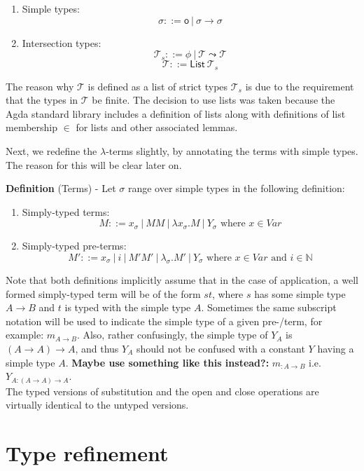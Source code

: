 \documentclass[a4paper, 12pt, twoside]{style/ociamthesis}
\providecommand{\tightlist}{%
  \setlength{\itemsep}{0pt}\setlength{\parskip}{0pt}}
\begin{document}
\begin{enumerate}
\def\labelenumi{\roman{enumi})}
\tightlist
\item
  Simple types: \[\sigma ::= \mathsf{o}\ |\ \sigma \to \sigma\]
\item
  Intersection types:
  \[\mathcal{T}_s ::= \phi\ |\ \mathcal{T} \leadsto \mathcal{T}\]
  \[\mathcal{T} ::= \mathsf{List}\ \mathcal{T}_s\]
\end{enumerate}

The reason why \(\mathcal{T}\) is defined as a list of strict types
\(\mathcal{T}_s\) is due to the requirement that the types in
\(\mathcal{T}\) be finite. The decision to use lists was taken because
the Agda standard library includes a definition of lists along with
definitions of list membership \(\in\) for lists and other associated
lemmas.

Next, we redefine the \(\lambda\)-terms slightly, by annotating the
terms with simple types. The reason for this will be clear later on.

\textbf{Definition} (Terms) - Let \(\sigma\) range over simple types in
the following definition:

\begin{enumerate}
\def\labelenumi{\roman{enumi})}
\tightlist
\item
  Simply-typed terms:
  \[M::= x_\sigma\ |\ MM\ |\ \lambda x_\sigma.M\ |\ Y_\sigma \text{ where }x \in Var\]
\item
  Simply-typed pre-terms:
  \[M'::= x_\sigma\ |\ i\ |\ M'M'\ |\ \lambda_\sigma.M'\ |\ Y_\sigma \text{ where }x \in Var\text{ and }i \in \mathbb{N}\]
\end{enumerate}

Note that both definitions implicitly assume that in the case of
application, a well formed simply-typed term will be of the form \(st\),
where \(s\) has some simple type \(A \to B\) and \(t\) is typed with the
simple type \(A\). Sometimes the same subscript notation will be used to
indicate the simple type of a given pre-/term, for example:
\(m_{A \to B}\). Also, rather confusingly, the simple type of \(Y_A\) is
\((A \to A) \to A\), and thus \(Y_A\) should not be confused with a
constant \(Y\) having a simple type \(A\). \textbf{Maybe use something
like this instead?:} \(m_{:A \to B}\) i.e. \(Y_{A:(A \to A) \to A}\).\\
The typed versions of substitution and the open and close operations are
virtually identical to the untyped versions.

\section{Type refinement}\label{type-refinement}
\end{document}
